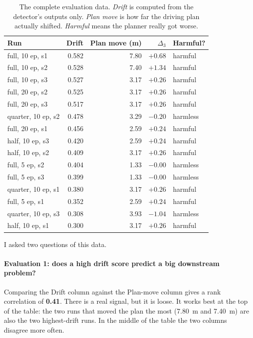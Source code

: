 \documentclass[11pt,a4paper]{article}
\begin{document}
\begin{table}[h!]
\centering
\caption{The complete evaluation data. \emph{Drift} is computed from the
detector's outputs only. \emph{Plan move} is how far the driving plan actually
shifted. \emph{Harmful} means the planner really got worse.}
\label{tab:drift}
\small
\renewcommand{\arraystretch}{1.15}
\begin{tabular}{@{}lrrrl@{}}
\toprule
\textbf{Run} & \textbf{Drift} & \textbf{Plan move (m)} & \textbf{$\Delta_3$} & \textbf{Harmful?} \\
\midrule
full, 10 ep, s1    & 0.582 & 7.80 & $+0.68$ & harmful \\
full, 10 ep, s2    & 0.528 & 7.40 & $+1.34$ & harmful \\
full, 10 ep, s3    & 0.527 & 3.17 & $+0.26$ & harmful \\
full, 20 ep, s2    & 0.525 & 3.17 & $+0.26$ & harmful \\
full, 20 ep, s3    & 0.517 & 3.17 & $+0.26$ & harmful \\
quarter, 10 ep, s2 & 0.478 & 3.29 & $-0.20$ & harmless \\
full, 20 ep, s1    & 0.456 & 2.59 & $+0.24$ & harmful \\
half, 10 ep, s3    & 0.420 & 2.59 & $+0.24$ & harmful \\
half, 10 ep, s2    & 0.409 & 3.17 & $+0.26$ & harmful \\
full, 5 ep, s2     & 0.404 & 1.33 & $-0.00$ & harmless \\
full, 5 ep, s3     & 0.399 & 1.33 & $-0.00$ & harmless \\
quarter, 10 ep, s1 & 0.380 & 3.17 & $+0.26$ & harmful \\
full, 5 ep, s1     & 0.352 & 2.59 & $+0.24$ & harmful \\
quarter, 10 ep, s3 & 0.308 & 3.93 & $-1.04$ & harmless \\
half, 10 ep, s1    & 0.300 & 3.17 & $+0.26$ & harmful \\
\bottomrule
\end{tabular}
\end{table}

I asked two questions of this data.

\paragraph{Evaluation 1: does a high drift score predict a big downstream
problem?} Comparing the Drift column against the Plan-move column gives a rank
correlation of \textbf{0.41}. There is a real signal, but it is loose. It works
best at the top of the table: the two runs that moved the plan the most (7.80~m
and 7.40~m) are also the two highest-drift runs. In the middle of the table the
two columns disagree more often.
\end{document}
